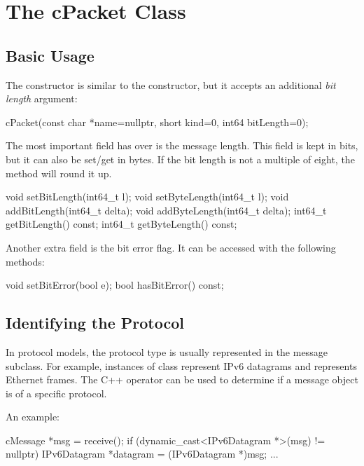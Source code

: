 \section{The cPacket Class}
\label{sec:msgs:cpacket}

\subsection{Basic Usage}
\label{sec:messages:cpacket-basic-usage}

The  constructor is similar to the 
constructor, but it accepts an additional \textit{bit length} argument:

\begin{cpp}
cPacket(const char *name=nullptr, short kind=0, int64 bitLength=0);
\end{cpp}

The most important field  has over  is
the message length. This field is kept in bits, but it can also be
set/get in bytes. If the bit length is not a multiple of eight, the
 method will round it up.

\begin{cpp}
void setBitLength(int64_t l);
void setByteLength(int64_t l);
void addBitLength(int64_t delta);
void addByteLength(int64_t delta);
int64_t getBitLength() const;
int64_t getByteLength() const;
\end{cpp}

Another extra field is the bit error flag. It can be accessed with the
following methods:

\begin{cpp}
void setBitError(bool e);
bool hasBitError() const;
\end{cpp}


\subsection{Identifying the Protocol}
\label{sec:messages:identifying-protocol-of-packet}

In {\opp} protocol models, the protocol type is usually represented in the
message subclass. For example, instances of class 
represent IPv6 datagrams and  represents Ethernet
frames. The C++  operator can be used to determine if a
message object is of a specific protocol.

An example:

\begin{cpp}
cMessage *msg = receive();
if (dynamic_cast<IPv6Datagram *>(msg) != nullptr)
{
    IPv6Datagram *datagram = (IPv6Datagram *)msg;
    ...
}
\end{cpp}


